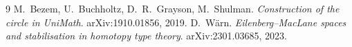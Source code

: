 \documentclass[11pt]{amsart}
\theoremstyle{definition}
\theoremstyle{remark}
\begin{document}
\begin{thebibliography}{9}
 M.~Bezem, U.~Buchholtz, D.~R.~Grayson, M.~Shulman. \emph{Construction of
  the circle in UniMath}. arXiv:1910.01856, 2019.
 D.~W\"arn. \emph{Eilenberg--MacLane spaces and stabilisation in homotopy
  type theory}. arXiv:2301.03685, 2023.
\end{thebibliography}
\end{document}
